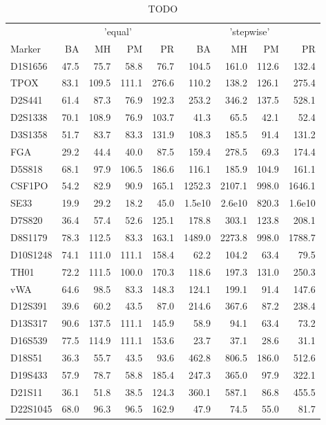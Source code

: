 \begin{table}[t]
\caption{TODO} 
\fontsize{12.0pt}{14.4pt}\selectfont
\begin{tabular}{lrrrrrrrr}
\toprule
 & \multicolumn{4}{c}{'equal'} & \multicolumn{4}{c}{'stepwise'} \\ 
\cmidrule(lr){2-5} \cmidrule(lr){6-9}
Marker & BA & MH & PM & PR & BA & MH & PM & PR \\ 
\midrule
D1S1656 & 47.5 & 75.7 & 58.8 & 76.7 & 104.5 & 161.0 & 112.6 & 132.4 \\ 
TPOX & 83.1 & 109.5 & 111.1 & 276.6 & 110.2 & 138.2 & 126.1 & 275.4 \\ 
D2S441 & 61.4 & 87.3 & 76.9 & 192.3 & 253.2 & 346.2 & 137.5 & 528.1 \\ 
D2S1338 & 70.1 & 108.9 & 76.9 & 103.7 & 41.3 & 65.5 & 42.1 & 52.4 \\ 
D3S1358 & 51.7 & 83.7 & 83.3 & 131.9 & 108.3 & 185.5 & 91.4 & 131.2 \\ 
FGA & 29.2 & 44.4 & 40.0 & 87.5 & 159.4 & 278.5 & 69.3 & 174.4 \\ 
D5S818 & 68.1 & 97.9 & 106.5 & 186.6 & 116.1 & 185.9 & 104.9 & 161.1 \\ 
CSF1PO & 54.2 & 82.9 & 90.9 & 165.1 & 1252.3 & 2107.1 & 998.0 & 1646.1 \\ 
SE33 & 19.9 & 29.2 & 18.2 & 45.0 & 1.5e10 & 2.6e10 & 820.3 & 1.6e10 \\ 
D7S820 & 36.4 & 57.4 & 52.6 & 125.1 & 178.8 & 303.1 & 123.8 & 208.1 \\ 
D8S1179 & 78.3 & 112.5 & 83.3 & 163.1 & 1489.0 & 2273.8 & 998.0 & 1788.7 \\ 
D10S1248 & 74.1 & 111.0 & 111.1 & 158.4 & 62.2 & 104.2 & 63.4 & 79.5 \\ 
TH01 & 72.2 & 111.5 & 100.0 & 170.3 & 118.6 & 197.3 & 131.0 & 250.3 \\ 
vWA & 64.6 & 98.5 & 83.3 & 148.3 & 124.1 & 199.1 & 91.4 & 147.6 \\ 
D12S391 & 39.6 & 60.2 & 43.5 & 87.0 & 214.6 & 367.6 & 87.2 & 238.4 \\ 
D13S317 & 90.6 & 137.5 & 111.1 & 145.9 & 58.9 & 94.1 & 63.4 & 73.2 \\ 
D16S539 & 77.5 & 114.9 & 111.1 & 153.6 & 23.7 & 37.1 & 28.6 & 31.1 \\ 
D18S51 & 36.3 & 55.7 & 43.5 & 93.6 & 462.8 & 806.5 & 186.0 & 512.6 \\ 
D19S433 & 57.9 & 78.7 & 58.8 & 185.4 & 247.3 & 365.0 & 97.9 & 322.1 \\ 
D21S11 & 36.1 & 51.8 & 38.5 & 124.3 & 360.1 & 587.1 & 86.8 & 455.5 \\ 
D22S1045 & 68.0 & 96.3 & 96.5 & 162.9 & 47.9 & 74.5 & 55.0 & 81.7 \\ 
\bottomrule
\end{tabular}
\end{table}

